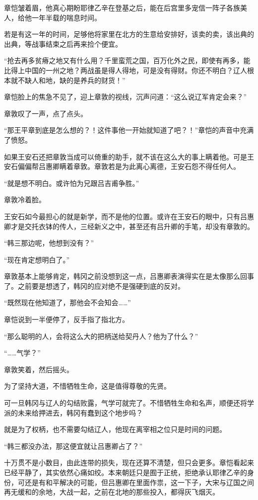 章恺皱着眉，他真心期盼耶律乙辛在登基之后，能在后宫里多宠信一阵子各族美人，给他一年半载的喘息时间。

若是有这一年的时间，足够他将家里在北方的生意给安排好，该卖的卖，该出典的出典，等战事结束之后再来捡个便宜。

“抢去再多贫瘠之地又有什么用？千里蛮荒之国，百万化外之民，即使有再多，能比得上中国的一州之地？两战虽是得人得地，可是没有得财。你还不明白？辽人根本就不缺人和地，缺的是养兵的财货！”

章恺脸上的焦急不见了，迎上章敦的视线，沉声问道：“这么说辽军肯定会来？”

章敦叹了一声，点了点头。

“那王平章到底是怎么想的？！这件事他一开始就知道了吧？！”章恺的声音中充满了愤怒。

如果王安石还把章敦当成可以倚重的助手，就不该在这么大的事上瞒着他。可是王安石偏偏帮吕惠卿瞒着章敦。章敦若是为此离心离德，王安石怨不得任何人。

“就是想不明白。或许怕为兄跟吕吉甫争胜。”

章敦冷着脸。

王安石如今最担心的就是新学，而不是他的位置。或许在王安石的眼中，只有吕惠卿才是交托衣钵的传人，三经新义之中，甚至还有吕升卿的手笔，却没有章敦的。

“韩三那边呢，他想到没有？”

“现在肯定想明白了。”

章敦基本上能够肯定，韩冈之前没想到这一点，吕惠卿表演得实在是太像那么回事了。之前要是想透了，韩冈的应对绝不是强硬到底的反对。

“既然现在他知道了，那他会不会知会……”

章恺说到一半便停了，反手指了指北方。

“那么聪明的人，会将这么大的把柄送给契丹人？他为了什么？”

“……气学？”

章敦笑着，然后摇头。

为了坚持大道，不惜牺牲生命，这是值得尊敬的先贤。

可一旦韩冈与辽人的勾结败露，气学可就完了。不惜牺牲生命和名声，顺便还将学派的未来给押进去，韩冈有蠢到这个地步吗？

就是为了权柄，也不需要勾结辽人，他现在离宰相之位只是时间的问题。

“韩三都没办法，那这便宜就让吕惠卿占了？”

十万贯不是小数目，由此连带的损失，现在还算不清楚，但只会更多。章恺看起来已经平静了，其实依然心痛如绞。本来朝廷只是囿于正统，拒绝承认耶律乙辛的身份，可还是有和平解决的可能，但吕惠卿在里面作祟，这一下子，大宋与辽国之间再无缓和的余地，大战一起，之前在北地的那些投入，都得灰飞烟灭。

